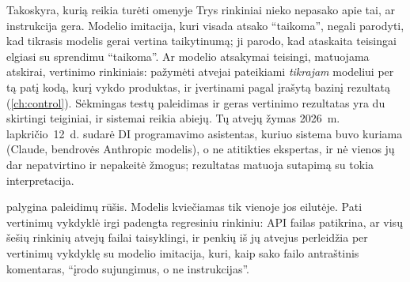 \begin{notebox}{Takoskyra, kurią reikia turėti omenyje}
Trys rinkiniai nieko nepasako apie tai, ar instrukcija gera. Modelio imitacija, kuri visada
atsako \enquote{taikoma}, negali parodyti, kad tikrasis modelis gerai vertina taikytinumą; ji
parodo, kad ataskaita teisingai elgiasi su sprendimu \enquote{taikoma}. Ar modelio atsakymai
teisingi, matuojama atskirai, vertinimo rinkiniais: pažymėti atvejai pateikiami \emph{tikrajam}
modeliui per tą patį kodą, kurį vykdo produktas, ir įvertinami pagal įrašytą bazinį rezultatą
(\cref{ch:control}). Sėkmingas testų paleidimas ir geras vertinimo rezultatas yra du skirtingi
teiginiai, ir sistemai reikia abiejų. Tų atvejų žymas 2026~m. lapkričio~12~d. sudarė DI
programavimo asistentas, kuriuo sistema buvo kuriama (Claude, bendrovės Anthropic modelis), o ne
atitikties ekspertas, ir nė vienos jų dar nepatvirtino ir nepakeitė žmogus; rezultatas matuoja
sutapimą su tokia interpretacija.
\end{notebox}

 palygina paleidimų rūšis. Modelis kviečiamas tik vienoje jos eilutėje.
Pati vertinimų vykdyklė irgi padengta regresiniu rinkiniu: API failas 
patikrina, ar visų šešių rinkinių atvejų failai taisyklingi, ir penkių iš jų atvejus perleidžia
per vertinimų vykdyklę su modelio imitacija, kuri, kaip sako failo antraštinis komentaras,
\enquote{įrodo sujungimus, o ne instrukcijas}.

